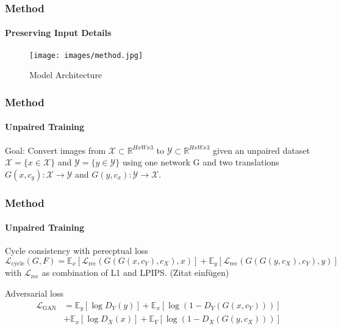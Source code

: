\documentclass[aspectratio=169, lecture, amberg]{OTHAWbeamer}
\begin{document}
\begin{frame}
\frametitle{Method}
\framesubtitle{Preserving Input Details}
\begin{figure}
    \centering
    \texttt{[image: images/method.jpg]}
    \caption{Model Architecture}
\end{figure}
\end{frame}

\begin{frame}
\frametitle{Method}
\framesubtitle{Unpaired Training}
Goal: Convert images from $\mathcal{X} \subset \mathbb{R} ^{H x W x 3}$ to $\mathcal{Y} \subset \mathbb{R} ^{H x W x 3}$ \newline
given an unpaired dataset $\mathcal{X} = \{x \in \mathcal{X} \}$ and $\mathcal{Y} = \{y \in \mathcal{Y} \}$ \newline
using one network G and two translations $G(x, c_y): \mathcal{X} \rightarrow \mathcal{Y}$ and $G(y, c_x): \mathcal{Y} \rightarrow \mathcal{X}$.

\end{frame}

\begin{frame}
\frametitle{Method}
\framesubtitle{Unpaired Training}
\begin{block}{Cycle consistency with perecptual loss}
    \begin{equation}
        \mathcal{L}_{\text{cycle}}(G, F) = \mathbb{E}_x [ \mathcal{L}_\text{rec} (G(G(x,c_Y), c_X), x) ] + \mathbb{E}_y [ \mathcal{L}_\text{rec} (G(G(y,c_X), c_Y), y) ]
    \end{equation}
    with $\mathcal{L}_{\text{rec}}$ as combination of L1 and LPIPS. (Zitat einfügen)
\end{block}
\begin{block}{Adversarial loss}
    \begin{align}
        \mathcal{L}_{\text{GAN}} &= \mathbb{E}_{y} [\log D_Y(y)] + \mathbb{E}_{x} [\log(1 - D_Y(G(x,c_Y)))] \\
        &+ \mathbb{E}_{x} [\log D_X(x)] + \mathbb{E}_{Y} [\log(1 - D_X(G(y,c_X)))]
    \end{align}
\end{block}
\end{frame}
\end{document}

